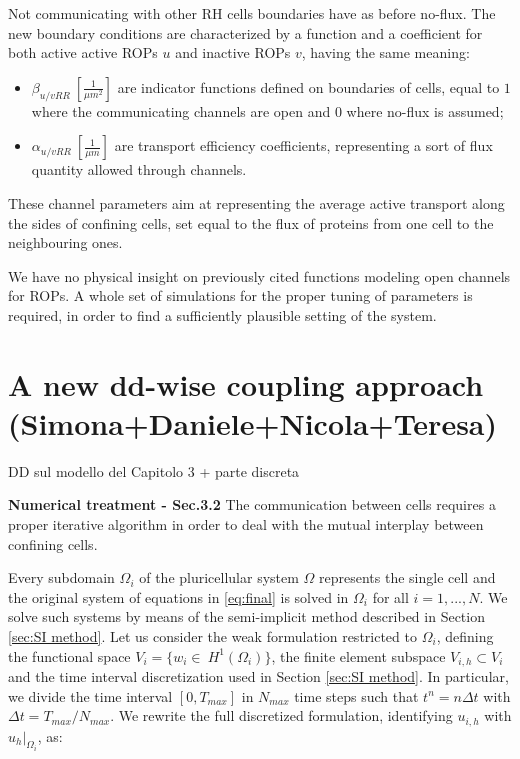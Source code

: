 \documentclass[a4paper]{siamart190516}
\begin{document}
Not communicating with other RH cells boundaries have as before no-flux. The new boundary conditions are characterized by a function and a coefficient for both active active ROPs $u$ and inactive ROPs $v$, having the same meaning:
\begin{itemize}
  \item $\beta_{u/v RR} \ [\frac{1}{\mu m^2}]$ are indicator functions defined on boundaries of cells, equal to $1$ where the communicating channels are open and $0$ where  no-flux is assumed;
  \item $\alpha_{u/v RR} \ [\frac{1}{\mu m}]$ are transport efficiency coefficients, representing a sort of flux quantity allowed through channels.
  \end{itemize}
These channel parameters aim at representing the average active transport along the sides of confining cells, set equal to the flux of proteins from one cell to the neighbouring ones.

We have no physical insight on previously cited functions modeling open channels for ROPs. A whole set of simulations for the proper tuning of parameters is required, in order to find a sufficiently plausible setting of the system.

\section{A new dd-wise coupling approach (Simona+Daniele+Nicola+Teresa)}

DD sul modello del Capitolo 3 + parte discreta

\textbf{Numerical treatment - Sec.3.2}
The communication between cells requires a proper iterative algorithm in order to deal with the mutual interplay between confining cells.

Every subdomain $\Omega_i$ of the pluricellular system $\Omega$ represents the single cell and the original system of equations in \eqref{eq:final} is solved in $\Omega_i$ for all $i = 1, ..., N$. We solve such systems by means of the semi-implicit method described in Section \ref{sec:SI method}. Let us consider the weak formulation restricted to $\Omega_i$, defining the functional space $V_i = \{ w_i \in \ H^1\left(\Omega_i\right)\}$, the finite element subspace $V_{i,h} \subset V_i $ and the time interval discretization used in Section \ref{sec:SI method}. In particular, we divide the time interval $\left[0, T_{max}\right]$ in $N_{max}$ time steps such that $t^n = n \Delta t$ with $\Delta t = T_{max} / N_{max}  $. We rewrite the full discretized formulation, identifying $u_{i,h}$ with $u_h|_{\Omega_i}$, as:
\end{document}
